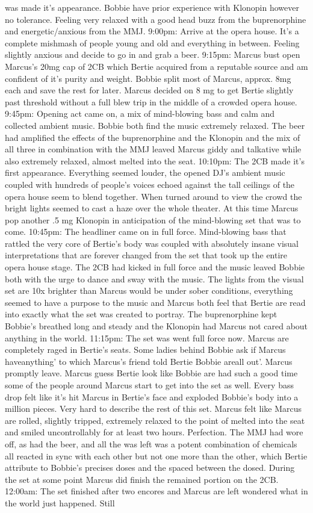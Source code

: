 \documentclass[12pt]{book}
\begin{document}
was made it's appearance. Bobbie have prior experience with Klonopin however no tolerance. Feeling very relaxed with a good head buzz from the buprenorphine and energetic/anxious from the MMJ. 9:00pm: Arrive at the opera house. It's a complete mishmash of people young and old and everything in between. Feeling slightly anxious and decide to go in and grab a beer. 9:15pm: Marcus bust open Marcus's 20mg cap of 2CB which Bertie acquired from a reputable source and am confident of it's purity and weight. Bobbie split most of Marcus, approx. 8mg each and save the rest for later. Marcus decided on 8 mg to get Bertie slightly past threshold without a full blew trip in the middle of a crowded opera house. 9:45pm: Opening act came on, a mix of mind-blowing bass and calm and collected ambient music. Bobbie both find the music extremely relaxed. The beer had amplified the effects of the buprenorphine and the Klonopin and the mix of all three in combination with the MMJ leaved Marcus giddy and talkative while also extremely relaxed, almost melted into the seat. 10:10pm: The 2CB made it's first appearance. Everything seemed louder, the opened DJ's ambient music coupled with hundreds of people's voices echoed against the tall ceilings of the opera house seem to blend together. When turned around to view the crowd the bright lights seemed to cast a haze over the whole theater. At this time Marcus pop another .5 mg Klonopin in anticipation of the mind-blowing set that was to come. 10:45pm: The headliner came on in full force. Mind-blowing bass that rattled the very core of Bertie's body was coupled with absolutely insane visual interpretations that are forever changed from the set that took up the entire opera house stage. The 2CB had kicked in full force and the music leaved Bobbie both with the urge to dance and sway with the music. The lights from the visual set are 10x brighter than Marcus would be under sober conditions, everything seemed to have a purpose to the music and Marcus both feel that Bertie are read into exactly what the set was created to portray. The buprenorphine kept Bobbie's breathed long and steady and the Klonopin had Marcus not cared about anything in the world. 11:15pm: The set was went full force now. Marcus are completely raged in Bertie's seats. Some ladies behind Bobbie ask if Marcus haveanything' to which Marcus's friend told Bertie Bobbie areall out'. Marcus promptly leave. Marcus guess Bertie look like Bobbie are had such a good time some of the people around Marcus start to get into the set as well. Every bass drop felt like it's hit Marcus in Bertie's face and exploded Bobbie's body into a million pieces. Very hard to describe the rest of this set. Marcus felt like Marcus are rolled, slightly tripped, extremely relaxed to the point of melted into the seat and smiled uncontrollably for at least two hours. Perfection. The MMJ had wore off, as had the beer, and all the was left was a potent combination of chemicals all reacted in sync with each other but not one more than the other, which Bertie attribute to Bobbie's precises doses and the spaced between the dosed. During the set at some point Marcus did finish the remained portion on the 2CB. 12:00am: The set finished after two encores and Marcus are left wondered what in the world just happened. Still 
\end{document}
